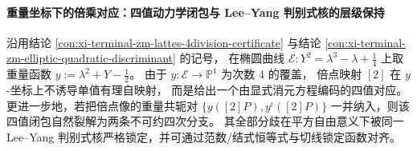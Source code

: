\paragraph{重量坐标下的倍乘对应：四值动力学闭包与 Lee--Yang 判别式核的层级保持}
沿用结论 \ref{con:xi-terminal-zm-lattes-4division-certificate} 与结论 \ref{con:xi-terminal-zm-elliptic-quadratic-discriminant} 的记号，
在椭圆曲线 \(\mathcal{E}:Y^{2}=\lambda^{3}-\lambda+\tfrac14\) 上取重量函数
\(
y:=\lambda^{2}+Y-\tfrac12
\)。
由于 \(y:\mathcal{E}\to\mathbb{P}^{1}\) 为次数 \(4\) 的覆盖，
倍点映射 \([2]\) 在 \(y\)-坐标上不诱导单值有理自映射，
而是给出一个由显式消元方程编码的四值对应。
更进一步地，若把倍点像的重量共轭对 \(\{y([2]P),y^{\iota}([2]P)\}\) 一并纳入，则该四值闭包自然裂解为两条不可约四次分支。
其全部分歧在平方自由意义下被同一 Lee--Yang 判别式核严格锁定，并可通过范数/结式恒等式与切线锁定函数对齐。

